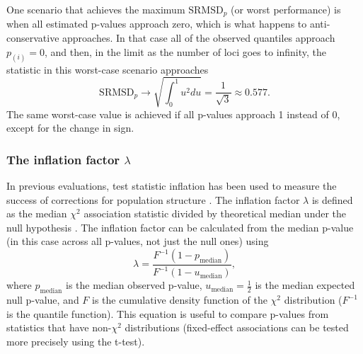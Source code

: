 \documentclass[11pt]{article}
\newcommand{\rmsd}{\text{SRMSD}_p}
\begin{document}
One scenario that achieves the maximum $\rmsd$ (or worst performance) is when all estimated p-values approach zero, which is what happens to anti-conservative approaches.
In that case all of the observed quantiles approach $p_{(i)} = 0$, and then, in the limit as the number of loci goes to infinity, the statistic in this worst-case scenario approaches
$$
\rmsd
\rightarrow
\sqrt{ \int_0^1 u^2 du }
=
\frac{1}{ \sqrt{ 3 } }
\approx
0.577
.
$$
The same worst-case value is achieved if all p-values approach 1 instead of 0, except for the change in sign.

\subsubsection{The inflation factor $\lambda$}

In previous evaluations, test statistic inflation has been used to measure the success of corrections for population structure \citep{astle_population_2009, price_new_2010}.
The inflation factor $\lambda$ is defined as the median $\chi^2$ association statistic divided by theoretical median under the null hypothesis \citep{devlin_genomic_1999}.
The inflation factor can be calculated from the median p-value (in this case across all p-values, not just the null ones) using
$$
\lambda
=
\frac{
  F^{-1} \left( 1 - p_\text{median} \right)
}{
  F^{-1} \left( 1 - u_\text{median} \right)
}
,
$$
where $p_\text{median}$ is the median observed p-value,
$u_\text{median} = \frac{1}{2}$ is the median expected null p-value,
and $F$ is the cumulative density function of the $\chi^2$ distribution ($F^{-1}$ is the quantile function).
This equation is useful to compare p-values from statistics that have non-$\chi^2$ distributions (fixed-effect associations can be tested more precisely using the t-test).
\end{document}

